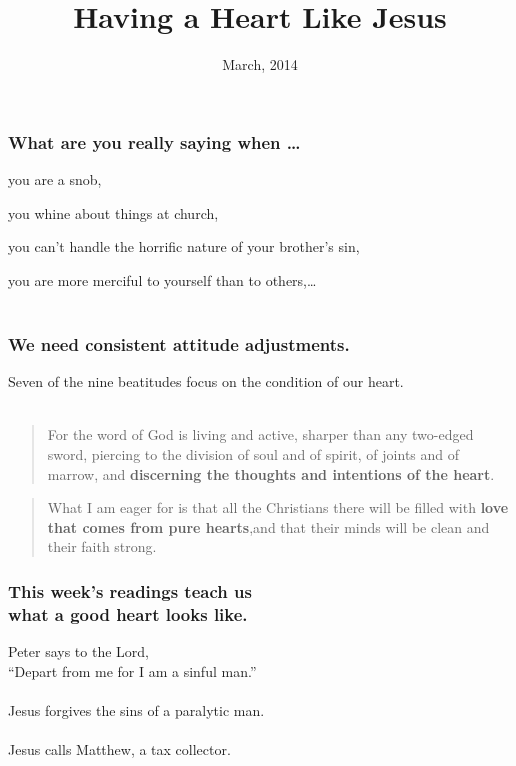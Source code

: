 \documentclass{beamer}
\title{Having a Heart Like Jesus}
\date{March, 2014}
\begin{document}
\frame{\titlepage}


\begin{frame}
\frametitle{What are you really saying when \dots}

you are a snob,

you whine about things at church,

you can't handle the horrific nature of your brother's sin,

you are more merciful to yourself than to others,\dots\\~\\

\centering{}

\end{frame}

\begin{frame}
\frametitle{We need consistent attitude adjustments.}
Seven of the nine beatitudes focus on the condition of our heart.\\~\\
\begin{quote}
For the word of God is living and active, sharper than any two-edged sword, piercing to the division of soul and of spirit, of joints and of marrow, and \textbf{discerning the thoughts and intentions of the heart}.

\end{quote}

\begin{quote}
What I am eager for is that all the Christians there will be filled with \textbf{love that comes from pure hearts},and that their minds will be clean and their faith strong.

\end{quote}
\end{frame}

\begin{frame}
\frametitle{This week's readings teach us\\what a good heart looks like.}
Peter says to the Lord,\\``Depart from me for I am a sinful man.''\\~\\
Jesus forgives the sins of a paralytic man.\\~\\
Jesus calls Matthew, a tax collector.
\end{frame}
\end{document}
